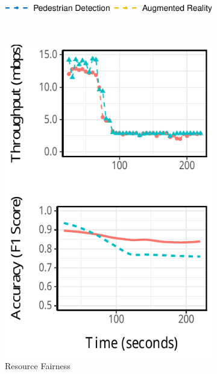 \begin{figure}
  \begin{subfigure}[t]{0.8\columnwidth}
    \centering
    \includegraphics[width=\textwidth]{figures/multitask-legend.pdf}
  \end{subfigure}
  \\
  \vspace{1em}
  \begin{subfigure}[t]{0.49\columnwidth}
    \centering
    \includegraphics[width=\textwidth]{figures/multitask-eq-bw.pdf}
    \caption{Resource Fairness}
    \label{fig:eq-bw}
  \end{subfigure}
  \hfill
  \begin{subfigure}[t]{0.49\columnwidth}

\end{subfigure}
\end{figure}
